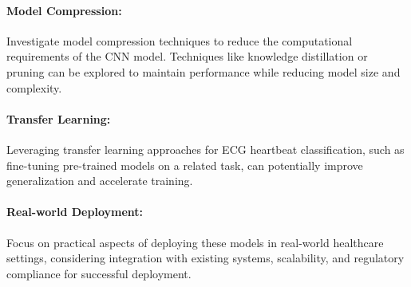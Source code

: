 \documentclass[]{acmsiggraph}
\begin{document}
\paragraph{Model Compression:}Investigate model compression techniques to reduce the computational requirements of the CNN model. Techniques like knowledge distillation or pruning can be explored to maintain performance while reducing model size and complexity.

\paragraph{Transfer Learning:} Leveraging transfer learning approaches for ECG heartbeat classification, such as fine-tuning pre-trained models on a related task, can potentially improve generalization and accelerate training.

\paragraph{Real-world Deployment:} Focus on practical aspects of deploying these models in real-world healthcare settings, considering integration with existing systems, scalability, and regulatory compliance for successful deployment.




\end{document}
